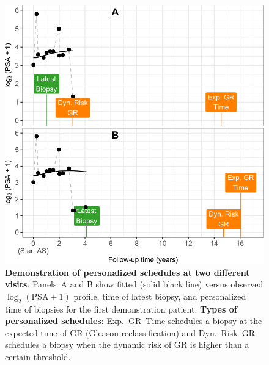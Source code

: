 \begin{figure}
\includegraphics{contents/c2/images/c2_fig2ab.pdf}
\caption{\textbf{Demonstration of personalized schedules at two different visits}. Panels~A and B show fitted (solid black line) versus observed $\log_2 (\mbox{PSA} + 1)$ profile, time of latest biopsy, and personalized time of biopsies for the first demonstration patient. \textbf{Types of personalized schedules}: Exp.~GR~Time schedules a biopsy at the expected time of GR (Gleason reclassification) and Dyn.~Risk~GR schedules a biopsy when the dynamic risk of GR is higher than a certain threshold.}
\label{c2:fig:2ab}
\end{figure}

